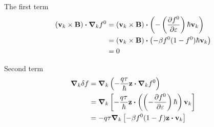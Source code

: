 \documentclass[a4paper]{article}
\newcommand{\hcut}{\hbar}
\begin{document}
The first term
\begin{equation}
	\label{firstterm}
	\begin{split}
		\left( \mathbf{v}_k \times  \mathbf{B} \right) \vdot \grad_k f^{0} &= \left( \mathbf{v}_k \times  \mathbf{B} \right) \vdot\left( -\left( \pdv{f^{0}}{\varepsilon} \right) \hcut \mathbf{v}_k \right) \\
										 &=	\left( \mathbf{v}_k \times  \mathbf{B} \right) \vdot \left( -\beta f^{0}(1 - f^{0})\hcut \mathbf{v}_k \right) \\
										 &= 0
	\end{split}
\end{equation}

Second term
\begin{equation}
	\label{secondterm}
	\begin{split}
	\grad_k \delta f &=  \grad_k \left( -\frac{q\tau}{\hcut} \mathbf{z}\vdot\grad_k f^{0} \right)\\
	&=  \grad_k \left[ -\frac{q\tau}{\hcut}\textbf{z}\vdot \left( \left( -\pdv{f^{0}}{\varepsilon} \right) \hcut \right) \mathbf{v}_k \right]  \\
	&= -q\tau\grad_k \left[ -\beta f^{0}(1-f^{}) \mathbf{z}\vdot\mathbf{v}_k \right] 
	\end{split}
\end{equation}

	
\end{document}
